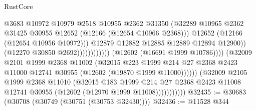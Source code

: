 \begin{lexlean}{RustCore}
\begin{coremodule}
                                                      @3683
                                                      @10972
                                                      @10979
                                                      @2518
                                                      @10955
                                                      @2362
                                                      @31350
                                                      (@32289
                                                        @10965
                                                        @2362
                                                        @31425
                                                        @30955
                                                        @12652
                                                        (@12166 (@12654 @10966 @2368)))
                                                      @12652
                                                      (@12166 (@12654 @10956 @10972)))
                                                    @12879
                                                    @12882
                                                    @12885
                                                    @12889
                                                    @12894
                                                    @12900))
                                                (@12270 @30850 @2692))))))))))))
                          (@12602 (@16691 @1999 @10786))))
                      (@32009
                        @2101
                        @1999
                        @2368
                        @11002
                        (@32015
                          @223
                          @1999
                          @214
                          @27
                          @2368
                          @2423
                          @11000
                          @12741
                          @30955
                          (@12602 (@19870 @1999 @11000))))))
                  (@32009
                    @2105
                    @1999
                    @2368
                    @11010
                    (@32015
                      @183
                      @1999
                      @214
                      @27
                      @2368
                      @2423
                      @11008
                      @12741
                      @30955
                      (@12602 (@12970 @1999 @11008)))))))))))
@32435 := @30683 (@30708 (@30749 (@30751 (@30753 @32430))))
@32436 := @11528 @344

\end{coremodule}
\end{lexlean}
